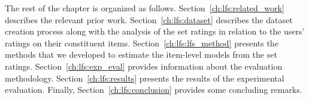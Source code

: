The rest of the chapter is organized as follows. 
Section~\ref{ch:lfs:related_work} describes the relevant
prior work. Section~\ref{ch:lfs:dataset} describes the dataset creation process
along with the analysis of the set ratings in relation to the users' ratings on
their constituent items. 
Section~\ref{ch:lfs:lfs_method} presents the methods that we developed to estimate the
item-level models from the set ratings. 
Section~\ref{ch:lfs:exp_eval} provides information about the evaluation methodology. 
Section~\ref{ch:lfs:results} presents the results of the experimental evaluation. Finally, 
Section~\ref{ch:lfs:conclusion} provides some concluding remarks.



